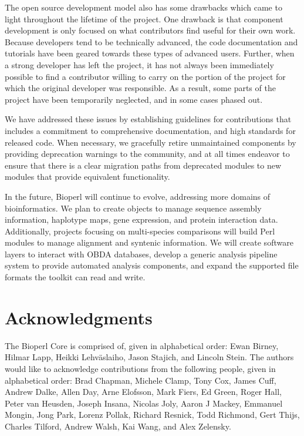 \documentclass[12pt]{article}
\begin{document}
The open source development model also has some drawbacks which came
to light throughout the lifetime of the project.  One drawback is that
component development is only focused on what contributors find useful
for their own work.  Because developers tend to be technically
advanced, the code documentation and tutorials have been geared
towards these types of advanced users.  Further, when a
strong developer has left the project, it has not always been
immediately possible to find a contributor willing to carry on the
portion of the project for which the original developer was
responsible.  As a result, some parts of the project have been
temporarily neglected, and in some cases phased out.

We have addressed these issues by establishing guidelines for
contributions that includes a commitment to comprehensive
documentation, and high standards for released code.  When necessary,
we gracefully retire unmaintained components by providing deprecation
warnings to the community, and at all times endeavor to ensure that
there is a clear migration paths from deprecated modules to new
modules that provide equivalent functionality.


In the future, Bioperl will continue to evolve, addressing more domains
of bioinformatics.  We plan to create objects to manage sequence
assembly information, haplotype maps, gene expression, and protein
interaction data.  Additionally, projects focusing on multi-species
comparisons will build Perl modules to manage alignment and syntenic
information.  We will create software layers to interact with OBDA
databases, develop a generic analysis pipeline system to provide
automated analysis components, and expand the supported file formats
the toolkit can read and write.

\section{Acknowledgments}

The Bioperl Core is comprised of, given in alphabetical order: Ewan
Birney, Hilmar Lapp, Heikki Lehv\"{a}slaiho, Jason Stajich, and
Lincoln Stein.  The authors would like to acknowledge contributions
from the following people, given in alphabetical order: Brad Chapman,
Michele Clamp, Tony Cox, James Cuff, Andrew Dalke, Allen Day, Arne
Elofsson, Mark Fiers, Ed Green, Roger Hall, Peter van Heusden, Joseph
Insana, Nicolas Joly, Aaron J Mackey, Emmanuel Mongin, Jong Park,
Lorenz Pollak, Richard Resnick, Todd Richmond, Gert Thijs, Charles
Tilford, Andrew Walsh, Kai Wang, and Alex Zelensky.
\end{document}
